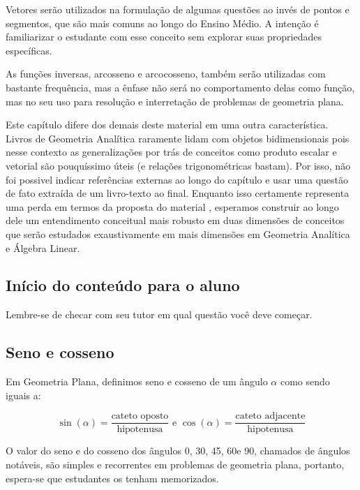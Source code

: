 \documentclass[main.tex]{subfiles}
\begin{document}
Vetores serão utilizados na formulação de algumas questões ao invés de pontos e segmentos, que são mais comuns ao longo do Ensino Médio. A intenção é familiarizar o estudante com esse conceito sem explorar suas propriedades específicas.

As funções inversas, arcosseno e arcocosseno, também serão utilizadas com bastante frequência, mas a ênfase não será no comportamento delas como função, mas no seu uso para resolução e interretação de problemas de geometria plana.

Este capítulo difere dos demais deste material em uma outra característica. Livros de Geometria Analítica raramente lidam com objetos bidimensionais pois nesse contexto as generalizações por trás de conceitos como produto escalar e vetorial são pouquíssimo úteis (e relações trigonométricas bastam). Por isso, não foi possivel indicar referências externas ao longo do capítulo e usar uma questão de fato extraída de um livro-texto ao final. Enquanto isso certamente representa uma perda em termos da proposta do material , esperamos construir ao longo dele um entendimento conceitual mais robusto em duas dimensões de conceitos que serão estudados exaustivamente em mais dimensões em Geometria Analítica e Álgebra Linear.

\subsection{Início do conteúdo para o aluno}

\paraAmbos

Lembre-se de checar com seu tutor em qual questão você deve começar.

\subsection*{Seno e cosseno}

Em Geometria Plana, definimos seno e cosseno de um ângulo $\alpha$ como sendo iguais a:

\begin{caixaExemplo}
$$ \sin(\alpha) = \frac{\text{cateto oposto}}{\text{hipotenusa}} \text{ e } \cos(\alpha) = \frac{\text{cateto adjacente}}{\text{hipotenusa}}$$
\end{caixaExemplo}

O valor do seno e do cosseno dos ângulos 0\degree, 30\degree, 45\degree, 60\degree e 90\degree, chamados de ângulos notáveis, são simples e recorrentes em problemas de geometria plana, portanto, espera-se que estudantes os tenham memorizados.
\end{document}
